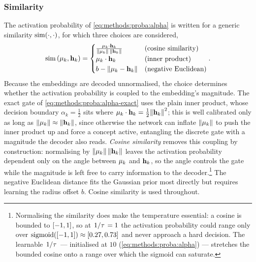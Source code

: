 \subsubsection{Similarity} \label{sec:methods:model:proba:sim}
The activation probability of \cref{eq:methods:proba:alpha} is written for a
generic similarity $\operatorname{sim}(\cdot, \cdot)$, for which three choices are
considered,
\begin{equation} \label{eq:methods:proba:sim}
    \operatorname{sim}\left(\vb{\mu}_k, \vb{h}_k\right) =
    \begin{cases}
        \frac{\vb{\mu}_k \cdot
        \vb{h}_k}{\norm{\vb{\mu}_k}\,\norm{\vb{h}_k}} & \text{(cosine
        similarity)} \\
        \vb{\mu}_k \cdot \vb{h}_k & \text{(inner product)} \\
        b - \norm{\vb{\mu}_k - \vb{h}_k} & \text{(negative Euclidean)}
    \end{cases}.
\end{equation}
Because the embeddings are decoded unnormalised, the choice determines whether
the activation probability is coupled to the embedding's magnitude. The exact
gate of \cref{eq:methods:proba:alpha-exact} uses the plain
inner product, whose decision boundary $\alpha_k = \tfrac{1}{2}$ sits where
$\vb{\mu}_k \cdot \vb{h}_k = \tfrac{1}{2}\norm{\vb{h}_k}^2$; this is well
calibrated only as long as $\norm{\vb{\mu}_k} \approx \norm{\vb{h}_k}$, since
otherwise the network can inflate $\norm{\vb{\mu}_k}$ to push the inner product
up and force a concept active, entangling the discrete gate with a magnitude the
decoder also reads. \textit{Cosine similarity} removes this coupling by
construction: normalising by $\norm{\vb{\mu}_k}\,\norm{\vb{h}_k}$ leaves the
activation probability dependent only on the angle between $\vb{\mu}_k$ and
$\vb{h}_k$, so the angle controls the gate while the magnitude is left free to
carry information to the decoder.\footnote{Normalising the similarity does make
    the temperature essential: a cosine is bounded to $\interval{-1}{1}$, so at
    $\flatfrac{1}{\tau} = 1$ the activation probability could range only over
    $\on{sigmoid}(\interval{-1}{1}) \approx \interval{0.27}{0.73}$ and never
approach a hard decision. The learnable $\flatfrac{1}{\tau}$ --- initialised at
$10$ (\cref{eq:methods:proba:alpha}) --- stretches the bounded
cosine onto a range over which the sigmoid can saturate.} The negative Euclidean
distance fits the Gaussian prior most directly but requires learning the radius
offset $b$. Cosine similarity is used throughout.

